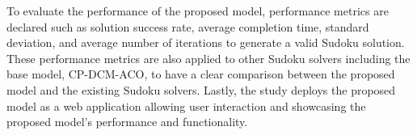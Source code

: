     To evaluate the performance of the proposed model, performance metrics are declared such as solution success rate, average completion time, standard deviation, and average number of iterations to generate a valid Sudoku solution. These performance metrics are also applied to other Sudoku solvers including the base model, CP-DCM-ACO, to have a clear comparison between the proposed model and the existing Sudoku solvers. Lastly, the study deploys the proposed model as a web application allowing user interaction and showcasing the proposed model’s performance and functionality. 






